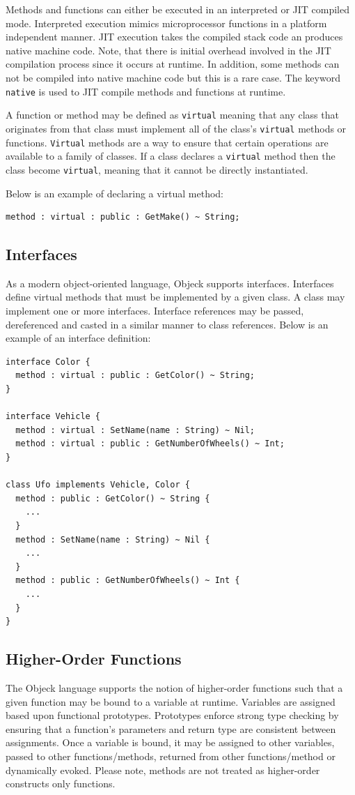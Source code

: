 \documentclass[11pt]{article}
\begin{document}
Methods and functions can either be executed in an interpreted or JIT
compiled mode. Interpreted execution mimics microprocessor functions
in a platform independent manner. JIT execution takes the compiled
stack code an produces native machine code. Note, that there is
initial overhead involved in the JIT compilation process since it
occurs at runtime. In addition, some methods can not be compiled into
native machine code but this is a rare case.  The keyword
\texttt{native} is used to JIT compile methods and functions at
runtime.

A function or method may be defined as \texttt{virtual} meaning that
any class that originates from that class must implement all of the
class's \texttt{virtual} methods or functions.  \texttt{Virtual}
methods are a way to ensure that certain operations are available to a
family of classes. If a class declares a \texttt{virtual} method then
the class become \texttt{virtual}, meaning that it cannot be directly
instantiated.

Below is an example of declaring a virtual method:
\begin{verbatim}
method : virtual : public : GetMake() ~ String;
\end{verbatim}

\subsection{Interfaces}
As a modern object-oriented language, Objeck supports interfaces.
Interfaces define virtual methods that must be implemented by a given
class.  A class may implement one or more interfaces.  Interface
references may be passed, dereferenced and casted in a similar manner
to class references.  Below is an example of an interface definition:

\begin{verbatim}
interface Color {
  method : virtual : public : GetColor() ~ String;
}

interface Vehicle {
  method : virtual : SetName(name : String) ~ Nil;
  method : virtual : public : GetNumberOfWheels() ~ Int;
}

class Ufo implements Vehicle, Color {
  method : public : GetColor() ~ String {
    ...
  }
  method : SetName(name : String) ~ Nil {
    ...
  }
  method : public : GetNumberOfWheels() ~ Int {
    ...
  }
}
\end{verbatim}

\subsection{Higher-Order Functions}
The Objeck language supports the notion of higher-order functions such
that a given function may be bound to a variable at runtime.
Variables are assigned based upon functional prototypes.  Prototypes
enforce strong type checking by ensuring that a function's parameters
and return type are consistent between assignments.  Once a variable
is bound, it may be assigned to other variables, passed to other
functions/methods, returned from other functions/method or dynamically
evoked.  Please note, methods are not treated as higher-order
constructs only functions.
\end{document}
